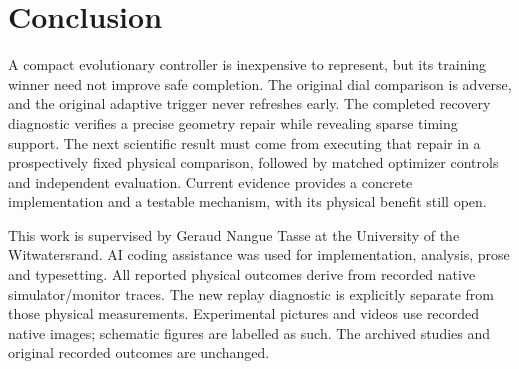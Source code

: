 \documentclass[sigconf,dvipsnames]{acmart}
\begin{document}
\section{Conclusion}
A compact evolutionary controller is inexpensive to represent, but its training
winner need not improve safe completion. The original dial comparison is adverse,
and the original adaptive trigger never refreshes early. The completed recovery
diagnostic verifies a precise geometry repair while revealing sparse timing support.
The next scientific result must come from executing that repair in a prospectively
fixed physical comparison, followed by matched optimizer controls and independent
evaluation. Current evidence provides a concrete implementation and a testable
mechanism, with its physical benefit still open.

\begin{acks}
This work is supervised by Geraud Nangue Tasse at the University of the Witwatersrand.
AI coding assistance was used for implementation, analysis, prose and typesetting.
All reported physical outcomes derive from recorded native simulator/monitor traces.
The new replay diagnostic is explicitly separate from those physical measurements.
Experimental pictures and videos use recorded native images; schematic figures are
labelled as such. The archived studies and original recorded outcomes are unchanged.
\end{acks}


\end{document}
